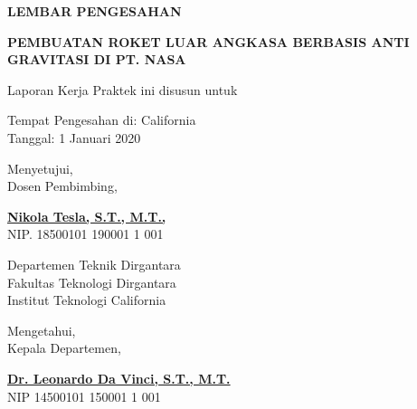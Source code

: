 \begin{center}
  {\Large \textbf{LEMBAR PENGESAHAN}}
  \vspace{6ex}

  {\large \textbf{PEMBUATAN ROKET LUAR ANGKASA BERBASIS ANTI GRAVITASI DI PT. NASA}}
  \vspace{6ex}

  Laporan Kerja Praktek ini disusun untuk \lipsum[1][1]
  \vspace{2ex}

  Tempat Pengesahan di: California \\
  Tanggal: 1 Januari 2020
  \vspace{6ex}

  Menyetujui, \\
  Dosen Pembimbing,
  \vspace{12ex}

  \textbf{\underline{Nikola Tesla, S.T., M.T.,}} \\
  NIP. 18500101 190001 1 001
  \vspace{4ex}

  Departemen Teknik Dirgantara \\
  Fakultas Teknologi Dirgantara \\
  Institut Teknologi California \\
  \vspace{2ex}

  Mengetahui, \\
  Kepala Departemen,
  \vspace{12ex}

  \textbf{\underline{Dr. Leonardo Da Vinci, S.T., M.T.}} \\
  NIP 14500101 150001 1 001

\end{center}